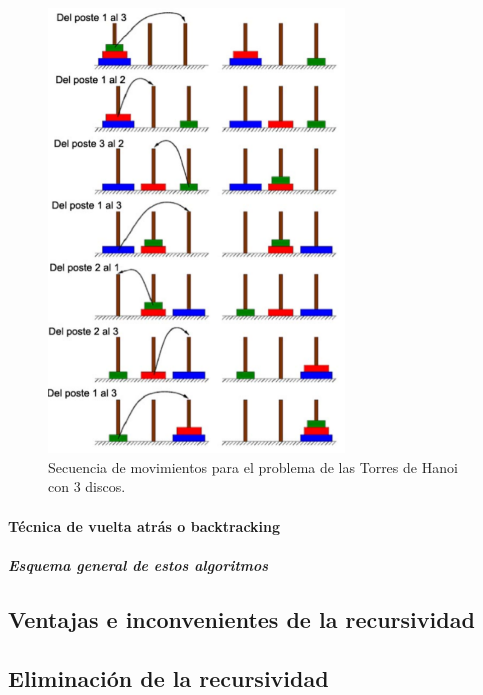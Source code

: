 \documentclass[a4paper, 11pt, titlepage]{article}
\begin{document}
                    \begin{figure}[htp]
                        \centering
                        \includegraphics[width=0.7\textwidth]{resources/recursividad05.png}
                        \caption{Secuencia de movimientos para el problema de las Torres de Hanoi con 
                        3 discos.}
                        \label{hanoi03}
                    \end{figure}

            \paragraph{Técnica de vuelta atrás o backtracking}

                \subparagraph{Esquema general de estos algoritmos}

    \subsection{Ventajas e inconvenientes de la recursividad}

    \subsection{Eliminación de la recursividad}
\end{document}
